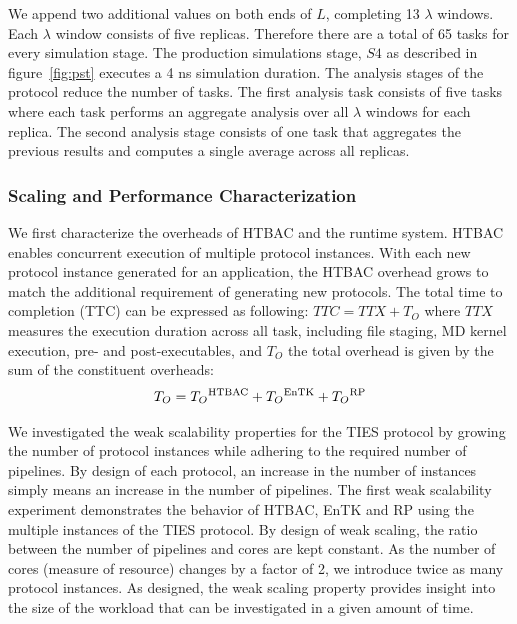 We append two additional values on both ends of $L$, completing 13 $\lambda$
windows. Each $\lambda$ window consists of five replicas. Therefore there are
a total of 65 tasks for every simulation stage. The production simulations
stage, $S4$ as described in figure~\ref{fig:pst} executes a 4 ns simulation
duration. The analysis stages of the protocol reduce the number of tasks. The
first analysis task consists of five tasks where each task performs an
aggregate analysis over all $\lambda$ windows for each replica. The second
analysis stage consists of one task that aggregates the previous results and
computes a single average across all replicas.

\subsubsection{Scaling and Performance Characterization}

We first characterize the overheads of HTBAC and the runtime system. HTBAC
enables concurrent execution of multiple protocol instances. With each new
protocol instance generated for an application, the HTBAC overhead grows to
match the additional requirement of generating new protocols. The total time
to completion (TTC) can be expressed as following: $TTC = TTX + T_{O}$ where
 \(TTX\) measures the execution duration across all task, including file
 staging, MD kernel execution, pre- and post-executables, and $T_{O}$ the
 total overhead is given by the sum of the constituent overheads: $$T_{O} =
 T_{O}\textsuperscript{HTBAC} + T_{O}\textsuperscript{EnTK} +
 T_{O}\textsuperscript{RP}$$



We investigated the weak scalability properties for the TIES protocol by
growing the number of protocol instances while adhering to the required
number of pipelines. By design of each protocol, an increase in the number of
instances simply means an increase in the number of pipelines. The first weak
scalability experiment demonstrates the behavior of HTBAC, EnTK and RP using
the multiple instances of the TIES protocol. By design of weak scaling, the
ratio between the number of pipelines and cores are kept constant. As the
number of cores (measure of resource) changes by a factor of 2, we introduce
twice as many protocol instances. As designed, the weak scaling property
provides insight into the size of the workload that can be investigated in a
given amount of time.

